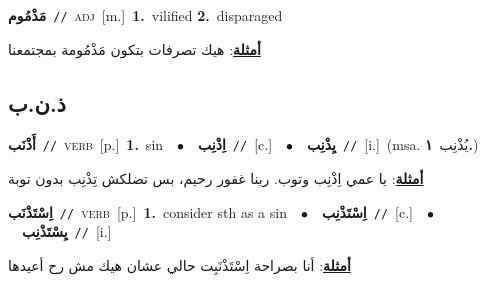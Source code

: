 \documentclass[10pt,a4paper,twoside]{article} %
\begin{document}
\begin{multicols}{2}
{\setlength\topsep{0pt}\textbf{\foreignlanguage{arabic}{مَذْمُوم}}\ {\color{gray}\texttt{//}\color{black}}\ \textsc{adj}\ [m.]\ \textbf{1.}~vilified  \textbf{2.}~disparaged\  \begin{flushright}\color{gray}\foreignlanguage{arabic}{\textbf{\underline{\foreignlanguage{arabic}{أمثلة}}}: هيك تصرفات بتكون مَذْمُومة بمجتمعنا}\end{flushright}\color{black}} \vspace{2mm}

\vspace{-3mm}
\subsection*{\color{blue}\foreignlanguage{arabic}{ذ.ن.ب}\color{blue}{}} 

{\setlength\topsep{0pt}\textbf{\foreignlanguage{arabic}{أَذْنَب}}\ {\color{gray}\texttt{//}\color{black}}\ \textsc{verb}\ [p.]\ \textbf{1.}~sin\ \ $\bullet$\ \ \setlength\topsep{0pt}\textbf{\foreignlanguage{arabic}{اِذْنِب}}\ {\color{gray}\texttt{//}\color{black}}\ [c.]\ \ $\bullet$\ \ \setlength\topsep{0pt}\textbf{\foreignlanguage{arabic}{يِذْنِب}}\ {\color{gray}\texttt{//}\color{black}}\ [i.]\ \color{gray}(msa. \foreignlanguage{arabic}{يُذْنِب}~\foreignlanguage{arabic}{\textbf{١.}})\color{black}\  \begin{flushright}\color{gray}\foreignlanguage{arabic}{\textbf{\underline{\foreignlanguage{arabic}{أمثلة}}}: يا عمي اِذْنِب وتوب. ربنا غفور رحيم، بس تضلكش تِذْنِب بدون توبة}\end{flushright}\color{black}} \vspace{2mm}

{\setlength\topsep{0pt}\textbf{\foreignlanguage{arabic}{اِسْتَذْنَب}}\ {\color{gray}\texttt{//}\color{black}}\ \textsc{verb}\ [p.]\ \textbf{1.}~consider sth as a sin\ \ $\bullet$\ \ \setlength\topsep{0pt}\textbf{\foreignlanguage{arabic}{اِسْتَذْنِب}}\ {\color{gray}\texttt{//}\color{black}}\ [c.]\ \ $\bullet$\ \ \setlength\topsep{0pt}\textbf{\foreignlanguage{arabic}{يِسْتَذْنِب}}\ {\color{gray}\texttt{//}\color{black}}\ [i.]\  \begin{flushright}\color{gray}\foreignlanguage{arabic}{\textbf{\underline{\foreignlanguage{arabic}{أمثلة}}}: أنا بصراحة اِسْتَذْنَبِت حالي عشان هيك مش رح أعيدها}\end{flushright}\color{black}} \vspace{2mm}


\end{multicols}
\end{document}

